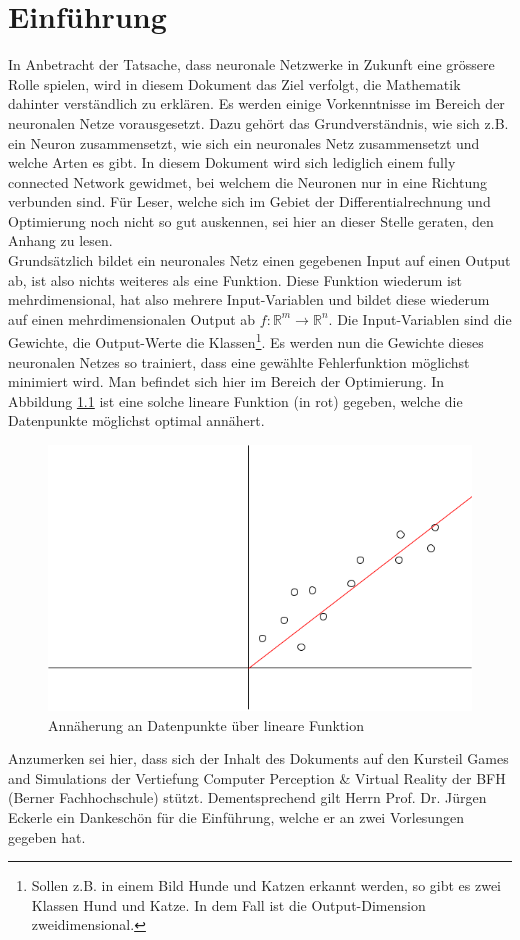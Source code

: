 \chapter{Einführung}
In Anbetracht der Tatsache, dass neuronale Netzwerke in Zukunft eine grössere Rolle spielen, wird in diesem Dokument
das Ziel verfolgt, die Mathematik dahinter verständlich zu erklären. Es werden einige Vorkenntnisse im Bereich der neuronalen Netze
vorausgesetzt. Dazu gehört das Grundverständnis, wie sich z.B. ein Neuron zusammensetzt, wie sich ein neuronales Netz
zusammensetzt und welche Arten es gibt. In diesem Dokument wird sich lediglich einem \glqq fully connected Network\grqq{} gewidmet,
bei welchem die Neuronen nur in eine Richtung verbunden sind. Für Leser, welche sich im Gebiet der
Differentialrechnung und Optimierung noch nicht so gut auskennen, sei hier an dieser Stelle geraten, den Anhang zu lesen.
\\

Grundsätzlich bildet ein neuronales Netz einen gegebenen Input auf einen Output ab, ist also nichts weiteres als
eine Funktion. Diese Funktion wiederum ist mehrdimensional, hat also mehrere Input-Variablen und bildet diese wiederum
auf einen mehrdimensionalen Output ab $f: \mathbb{R}^m \rightarrow \mathbb{R}^n$. Die Input-Variablen sind die Gewichte, die Output-Werte
die Klassen\footnote{Sollen z.B. in einem Bild Hunde und Katzen erkannt werden, so gibt es zwei Klassen \glqq Hund\grqq{} und \glqq Katze\grqq.
In dem Fall ist die Output-Dimension zweidimensional.}. Es werden nun die Gewichte dieses neuronalen Netzes so trainiert, dass eine gewählte Fehlerfunktion
möglichst minimiert wird. Man befindet sich hier im Bereich der Optimierung. In Abbildung \ref{fig:05_approximation}
ist eine solche lineare Funktion (in rot) gegeben, welche die Datenpunkte möglichst optimal annähert.
\begin{figure}[h!]
    \begin{center}
        \includegraphics[width=0.3\linewidth]{../common/00_introduction/00_resources/00_approximation.png}
    \end{center}
    \caption{Annäherung an Datenpunkte über lineare Funktion}
    \label{fig:05_approximation}
\end{figure}

Anzumerken sei hier, dass sich der Inhalt des Dokuments auf den Kursteil \glqq Games and Simulations\grqq{} der Vertiefung
\glqq Computer Perception \& Virtual Reality\grqq{} der BFH (Berner Fachhochschule) stützt. Dementsprechend gilt Herrn
Prof. Dr. Jürgen Eckerle ein Dankeschön für die Einführung, welche er an zwei Vorlesungen gegeben hat.